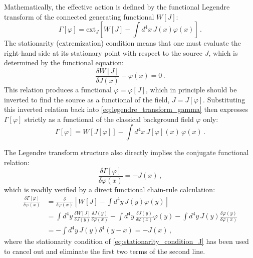 Mathematically, the effective action is defined by the functional Legendre transform of the connected generating functional \(W[J]\):
\begin{equation} \label{eq:legendre_transform_gamma}
    \Gamma[\varphi] = \text{ext}_J \left[ W[J] - \int d^4x \, J(x)\varphi(x) \right] \, .
\end{equation}
The stationarity (extremization) condition means that one must evaluate the right-hand side at its stationary point with respect to the source \(J\), which is determined by the functional equation:
\begin{equation} \label{eq:stationarity_condition_J}
    \frac{\delta W[J]}{\delta J(x)} - \varphi(x) = 0 \, .
\end{equation}
This relation produces a functional \(\varphi = \varphi[J]\), which in principle should be inverted to find the source as a functional of the field, \(J = J[\varphi]\). Substituting this inverted relation back into \eqref{eq:legendre_transform_gamma} then expresses \(\Gamma[\varphi]\) strictly as a functional of the classical background field \(\varphi\) only:
\begin{equation} \label{eq:gamma_explicit_phi}
    \Gamma[\varphi] = W[J[\varphi]] - \int d^4x \, J[\varphi](x) \, \varphi(x) \, .
\end{equation}

The Legendre transform structure also directly implies the conjugate functional relation:
\begin{equation} \label{eq:conjugate_legendre_relation}
    \frac{\delta \Gamma[\varphi]}{\delta \varphi(x)} = -J(x) \, ,
\end{equation}
which is readily verified by a direct functional chain-rule calculation:
\begin{equation} \label{eq:legendre_verification}
    \begin{aligned}
        \frac{\delta \Gamma[\varphi]}{\delta \varphi(x)} & = \frac{\delta}{\delta \varphi(x)} \left[ W[J] - \int d^4y \, J(y)\varphi(y) \right]                                                                                                                                 \\
                                                         & = \int d^4y \, \frac{\delta W[J]}{\delta J(y)} \frac{\delta J(y)}{\delta \varphi(x)} - \int d^4y \, \frac{\delta J(y)}{\delta \varphi(x)} \varphi(y) - \int d^4y \, J(y) \frac{\delta \varphi(y)}{\delta \varphi(x)} \\
                                                         & = - \int d^4y \, J(y) \delta^4(y - x) = -J(x) \, ,
    \end{aligned}
\end{equation}
where the stationarity condition of \eqref{eq:stationarity_condition_J} has been used to cancel out and eliminate the first two terms of the second line.

